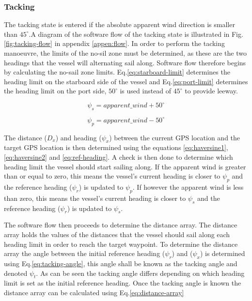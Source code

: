 \subsubsection{Tacking}
The tacking state is entered if the absolute apparent wind direction is smaller than $45^{\circ}$.A diagram of the software flow of the tacking state is illustrated in 
Fig.\ref{fig:tacking-flow} in appendix \ref{appen:flow}.
 In order to perform the tacking manoeuvre, the limits of the no-sil zone must be determined, 
as these are the two headings that the vessel will alternating sail along. Software flow therefore begins by calculating the no-sail zone limits. Eq.\ref{eq:starboard-limit} determines the 
heading limit on the starboard side of the vessel and Eq.\ref{eq:port-limit} determines the heading limit on the port side, $50^{\circ}$ is used instead of $45^{\circ}$ to provide leeway.

\begin{equation}
    \label{eq:starboard-limit}
    \psi_{s} = apparent\_wind + 50^{\circ}
\end{equation}

\begin{equation}
    \label{eq:port-limit}
    \psi_{p} = apparent\_wind - 50^{\circ}
\end{equation}

The distance ($D_x$) and heading ($\psi_x$) between the current GPS location and the target GPS location is then determined using the equations \ref{eq:haversine1}, \ref{eq:haversine2} and \ref{eq:ref-heading}.
A check is then done to determine which heading limit the vessel should start sailing along. If the apparent wind is greater than or equal to zero, this means the vessel's current heading is 
closer to $\psi_{p}$ and the reference heading ($\psi_r$) is updated to $\psi_{p}$. If however the apparent wind is less than zero, this means the vessel's current heading is closer to $\psi_{s}$
and the reference heading ($\psi_r$) is updated to $\psi_{s}$. 

The software flow then proceeds to determine the distance array. The distance array holds the values of the distances that the vessel should sail along each heading limit in order to reach 
the target waypoint. To determine the distance array the angle between the initial reference heading ($\psi_r$) and ($\psi_x$) is determined using Eq.\ref{eq:tacking-angle}, this angle shall be known as the tacking 
angle and denoted $\psi_{t}$. As can be seen the tacking angle differs depending on which heading limit is set as the initial reference heading. Once the tacking angle is known the distance array 
can be calculated using Eq.\ref{eq:distance-array}

